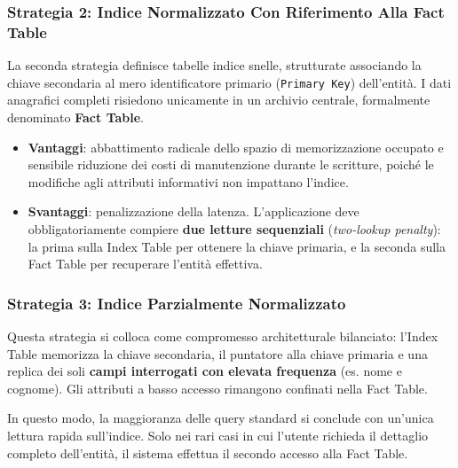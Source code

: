 \documentclass[11pt, a4paper]{article}
\begin{document}
\subsubsection{Strategia 2: Indice Normalizzato Con Riferimento Alla Fact Table}

La seconda strategia definisce tabelle indice snelle, strutturate associando la chiave secondaria al mero identificatore primario (\texttt{Primary Key}) dell'entità. I dati anagrafici completi risiedono unicamente in un archivio centrale, formalmente denominato \textbf{Fact Table}.


\begin{itemize}[noitemsep]
    \item \textbf{Vantaggi}: abbattimento radicale dello spazio di memorizzazione occupato e sensibile riduzione dei costi di manutenzione durante le scritture, poiché le modifiche agli attributi informativi non impattano l'indice.
    \item \textbf{Svantaggi}: penalizzazione della latenza. L'applicazione deve obbligatoriamente compiere \textbf{due letture sequenziali} (\emph{two-lookup penalty}): la prima sulla Index Table per ottenere la chiave primaria, e la seconda sulla Fact Table per recuperare l'entità effettiva.
\end{itemize}

\subsubsection{Strategia 3: Indice Parzialmente Normalizzato}

Questa strategia si colloca come compromesso architetturale bilanciato: l'Index Table memorizza la chiave secondaria, il puntatore alla chiave primaria e una replica dei soli \textbf{campi interrogati con elevata frequenza} (es. nome e cognome). Gli attributi a basso accesso rimangono confinati nella Fact Table.


In questo modo, la maggioranza delle query standard si conclude con un'unica lettura rapida sull'indice. Solo nei rari casi in cui l'utente richieda il dettaglio completo dell'entità, il sistema effettua il secondo accesso alla Fact Table.
\end{document}
